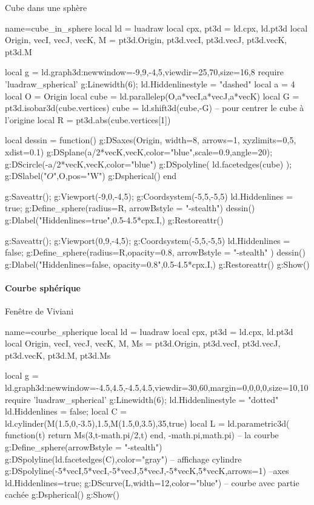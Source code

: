 \begin{demo}{Cube dans une sphère}
\begin{luadraw}{name=cube_in_sphere}
local ld = luadraw
local cpx, pt3d = ld.cpx, ld.pt3d
local Origin, vecI, vecJ, vecK, M = pt3d.Origin, pt3d.vecI, pt3d.vecJ, pt3d.vecK, pt3d.M

local g = ld.graph3d:new{window={-9,9,-4,5},viewdir={25,70},size={16,8}}
require 'luadraw_spherical'
g:Linewidth(6); ld.Hiddenlinestyle = "dashed"
local a = 4
local O = Origin
local cube = ld.parallelep(O,a*vecI,a*vecJ,a*vecK)
local G = pt3d.isobar3d(cube.vertices)
cube = ld.shift3d(cube,-G) -- pour centrer le cube à l'origine
local R = pt3d.abs(cube.vertices[1])

local dessin = function()
    g:DSaxes(Origin, {width=8, arrows=1, xyzlimits={0,5}, xdist=0.1})
    g:DSplane({a/2*vecK,vecK},{color="blue",scale=0.9,angle=20}); 
    g:DScircle({-a/2*vecK,vecK},{color="blue"})
    g:DSpolyline( ld.facetedges(cube) ); g:DSlabel("$O$",O,{pos="W"})
    g:Dspherical()
end

g:Saveattr(); g:Viewport(-9,0,-4,5); g:Coordsystem(-5,5,-5,5)
ld.Hiddenlines = true; g:Define_sphere({radius=R, arrowBstyle = "-stealth"})
dessin()
g:Dlabel("Hiddenlines=true",0.5-4.5*cpx.I,{})
g:Restoreattr()

g:Saveattr(); g:Viewport(0,9,-4,5); g:Coordsystem(-5,5,-5,5)
ld.Hiddenlines = false; g:Define_sphere({radius=R,opacity=0.8, arrowBstyle = "-stealth"} )
dessin()
g:Dlabel("Hiddenlines=false, opacity=0.8",0.5-4.5*cpx.I,{})
g:Restoreattr()
g:Show()
\end{luadraw}
\end{demo}

\paragraph{Courbe sphérique}

\begin{demo}{Fenêtre de Viviani}
\begin{luadraw}{name=courbe_spherique}
local ld = luadraw
local cpx, pt3d = ld.cpx, ld.pt3d
local Origin, vecI, vecJ, vecK, M, Ms = pt3d.Origin, pt3d.vecI, pt3d.vecJ, pt3d.vecK, pt3d.M, pt3d.Ms

local g = ld.graph3d:new{window={-4.5,4.5,-4.5,4.5},viewdir={30,60},margin={0,0,0,0},size={10,10}}
require 'luadraw_spherical'
g:Linewidth(6); ld.Hiddenlinestyle = "dotted"
ld.Hiddenlines = false; 
local C = ld.cylinder(M(1.5,0,-3.5),1.5,M(1.5,0,3.5),35,true)
local L = ld.parametric3d( function(t) return Ms(3,t-math.pi/2,t) end, -math.pi,math.pi) -- la courbe
g:Define_sphere({arrowBstyle = "-stealth"})
g:DSpolyline(ld.facetedges(C),{color="gray"}) -- affichage cylindre
g:DSpolyline({{-5*vecI,5*vecI},{-5*vecJ,5*vecJ},{-5*vecK,5*vecK}},{arrows=1}) --axes
ld.Hiddenlines=true; g:DScurve(L,{width=12,color="blue"}) -- courbe avec partie cachée
g:Dspherical()
g:Show()
\end{luadraw}
\end{demo}

